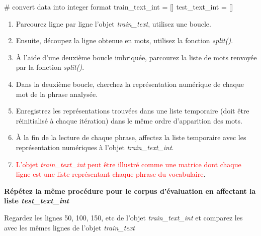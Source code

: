\begin{python}
	# convert data into integer format
	train_text_int = []
	test_text_int = []
	
\end{python}
\begin{enumerate}
	\item Parcourez ligne par ligne l'objet \textit{train\_text}, utilisez une boucle.
	\item Ensuite, découpez la ligne obtenue en mots, utilisez la fonction \textit{split()}.
	\item À l'aide d'une deuxième boucle imbriquée, parcourez la liste de mots renvoyée par la fonction \textit{split()}.
	\item Dans la deuxième boucle, cherchez la représentation numérique de chaque mot de la phrase analysée.
	\item Enregistrez les représentations trouvées dans une liste temporaire (doit être réinitialisé à chaque itération) dans le même ordre d'apparition des mots.
	\item À la fin de la lecture de chaque phrase, affectez la liste temporaire avec les représentation numériques à l'objet \textit{train\_text\_int}.
	\item \textcolor{red}{L'objet \textit{train\_text\_int} peut être illustré comme une matrice dont chaque ligne est une liste représentant chaque phrase du vocabulaire}.
\end{enumerate}  




\textbf{
Répétez la même procédure pour le corpus d'évaluation en affectant la liste \textit{test\_text\_int}}

Regardez les lignes 50, 100, 150, etc de l'objet \textit{train\_text\_int} et comparez les avec les mêmes lignes de l'objet \textit{train\_text}